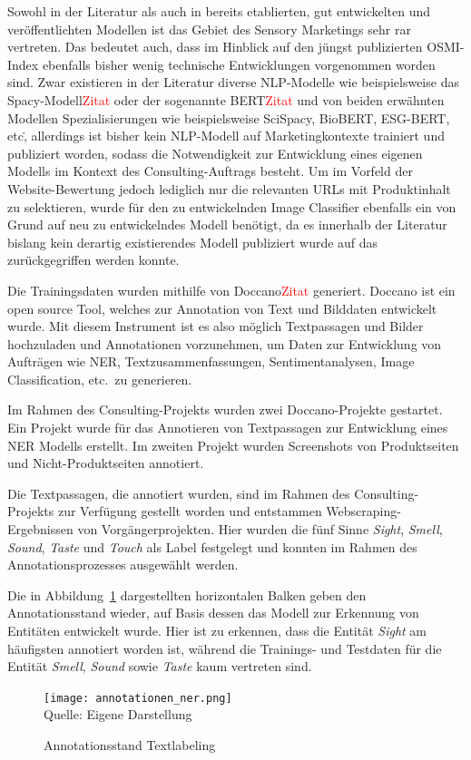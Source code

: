 Sowohl in der Literatur als auch in bereits etablierten, gut entwickelten und veröffentlichten Modellen ist das Gebiet
des Sensory Marketings sehr rar vertreten.
Das bedeutet auch, dass im Hinblick auf den jüngst publizierten \ac{OSMI}-Index ebenfalls bisher wenig technische Entwicklungen
vorgenommen worden sind.
Zwar existieren in der Literatur diverse NLP-Modelle wie beispielsweise das Spacy-Modell\textcolor{red}{Zitat} oder der sogenannte BERT\textcolor{red}{Zitat}
und von beiden erwähnten Modellen Spezialisierungen wie beispielsweise SciSpacy, BioBERT, ESG-BERT, etc\., allerdings ist
bisher kein \ac{NLP}-Modell auf Marketingkontexte trainiert und publiziert worden, sodass die Notwendigkeit zur Entwicklung eines
eigenen Modells im Kontext des Consulting-Auftrags besteht.
Um im Vorfeld der Website-Bewertung jedoch lediglich nur die relevanten URLs mit Produktinhalt zu selektieren, wurde für den zu
entwickelnden Image Classifier ebenfalls ein von Grund auf neu zu entwickelndes Modell benötigt, da es innerhalb der Literatur
bislang kein derartig existierendes Modell publiziert wurde auf das zurückgegriffen werden konnte.

Die Trainingsdaten wurden mithilfe von Doccano\textcolor{red}{Zitat} generiert.
Doccano ist ein open source Tool, welches zur Annotation von Text und Bilddaten entwickelt wurde.
Mit diesem Instrument ist es also möglich Textpassagen und Bilder hochzuladen und Annotationen vorzunehmen, um Daten zur
Entwicklung von Aufträgen wie \acl{NER}, Textzusammenfassungen, Sentimentanalysen, Image Classification, etc.\ zu generieren.

Im Rahmen des Consulting-Projekts wurden zwei Doccano-Projekte gestartet.
Ein Projekt wurde für das Annotieren von Textpassagen zur Entwicklung eines \acl{NER} Modells erstellt.
Im zweiten Projekt wurden Screenshots von Produktseiten und Nicht-Produktseiten annotiert.

Die Textpassagen, die annotiert wurden, sind im Rahmen des Consulting-Projekts zur Verfügung gestellt worden und entstammen
Webscraping-Ergebnissen von Vorgängerprojekten.
Hier wurden die fünf Sinne \textit{Sight}, \textit{Smell}, \textit{Sound}, \textit{Taste} und \textit{Touch} als Label festgelegt und konnten im Rahmen des Annotationsprozesses ausgewählt werden.

Die in Abbildung~\ref{fig:annotation_ner} dargestellten horizontalen Balken geben den Annotationsstand wieder, auf Basis dessen
das Modell zur Erkennung von Entitäten entwickelt wurde.
Hier ist zu erkennen, dass die Entität \textit{Sight} am häufigsten annotiert worden ist, während die Trainings- und Testdaten für
die Entität \textit{Smell}, \textit{Sound} sowie \textit{Taste} kaum vertreten sind.
\begin{figure}[H]
	\caption{Annotationsstand Textlabeling}\label{fig:annotation_ner}
	\texttt{[image: annotationen\_ner.png]}
	\\
	Quelle: Eigene Darstellung
\end{figure}

